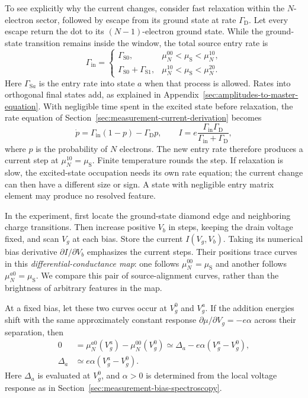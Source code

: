 To see explicitly why the current changes, consider fast relaxation
within the $N$-electron sector, followed by escape from its ground
state at rate $\Gamma_{\mathrm D}$. Let every escape return the dot
to its $(N-1)$-electron ground state. While the ground-state
transition remains inside the window, the total source entry rate is
\[
 \Gamma_{\mathrm{in}}=
 \begin{cases}
  \Gamma_{\mathrm S0},&\mu_N^{00}<\mu_{\mathrm S}<\mu_N^{10},\\
  \Gamma_{\mathrm S0}+\Gamma_{\mathrm S1},
       &\mu_N^{10}<\mu_{\mathrm S}<\mu_N^{20}.
 \end{cases}
\]
Here $\Gamma_{\mathrm Sa}$ is the entry rate into state $a$ when
that process is allowed. Rates into orthogonal final states add,
as explained in Appendix~\ref{sec:amplitudes-to-master-equation}.
With negligible time spent in the excited
state before relaxation, the rate equation of
Section~\ref{sec:measurement-current-derivation} becomes
\begin{equation}
 \dot p=\Gamma_{\mathrm{in}}(1-p)-\Gamma_{\mathrm D}p,
 \qquad
 I=e\frac{\Gamma_{\mathrm{in}}\Gamma_{\mathrm D}}
             {\Gamma_{\mathrm{in}}+\Gamma_{\mathrm D}},
 \label{eq:measurement-excited-channel-current}
\end{equation}
where $p$ is the probability of $N$ electrons. The new entry rate
therefore produces a current step at
$\mu_N^{10}=\mu_{\mathrm S}$. Finite temperature rounds the step.
If relaxation is slow, the excited-state occupation needs its own
rate equation; the current change can then have a different size
or sign. A state with negligible entry matrix element may produce
no resolved feature.

In the experiment, first locate the ground-state diamond edge and
neighboring charge transitions. Then increase positive $V_b$ in
steps, keeping the drain voltage fixed, and scan $V_g$ at each bias.
Store the current $I(V_g,V_b)$. Taking its numerical bias derivative
$\partial I/\partial V_b$ emphasizes the current steps. Their
positions trace curves in this \emph{differential-conductance map}:
one follows $\mu_N^{00}=\mu_{\mathrm S}$ and another follows
$\mu_N^{a0}=\mu_{\mathrm S}$. We compare this pair of source-alignment
curves, rather than the brightness of arbitrary features in the map.

At a fixed bias, let these two curves occur at $V_g^0$ and $V_g^a$.
If the addition energies shift with the same approximately constant
response $\partial\mu/\partial V_g=-e\alpha$ across their separation,
then
\begin{equation}
 \begin{aligned}
 0&=\mu_N^{a0}(V_g^a)-\mu_N^{00}(V_g^0)
       \simeq\Delta_a-e\alpha(V_g^a-V_g^0),\\
 \Delta_a&\simeq e\alpha(V_g^a-V_g^0).
 \end{aligned}
 \label{eq:measurement-excitation-voltage-spacing}
\end{equation}
Here $\Delta_a$ is evaluated at $V_g^0$, and $\alpha>0$ is
determined from the local voltage response as in
Section~\ref{sec:measurement-bias-spectroscopy}.

